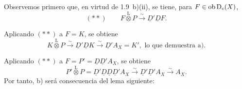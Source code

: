 Observemos primero que, en virtud de 1.9~b)(ii), se tiene, para $F \in \operatorname{ob} \mathrm{D}_c(X)$,
\[
(**) \qquad F \mathop{\otimes}\limits^{\mathrm{L}} P \xrightarrow{\sim} \underline{D}'\underline{D} F.
\]

Aplicando $(**)$ a $F = K$, se obtiene
\[
K \mathop{\otimes}\limits^{\mathrm{L}} P \xrightarrow{\sim} \underline{D}'\underline{D} K \xrightarrow{\sim} \underline{D}' A_X = K', \text{ lo que demuestra a).}
\]

Aplicando $(**)$ a $F = P' = \underline{D}\underline{D}'A_X$, se obtiene
\[
P' \mathop{\otimes}\limits^{\mathrm{L}} P = \underline{D}'\underline{D}\underline{D}\underline{D}'A_X \xrightarrow{\sim} \underline{D}'\underline{D}'A_X \xrightarrow{\sim} A_X.
\]
Por tanto, b) será consecuencia del lema siguiente:

